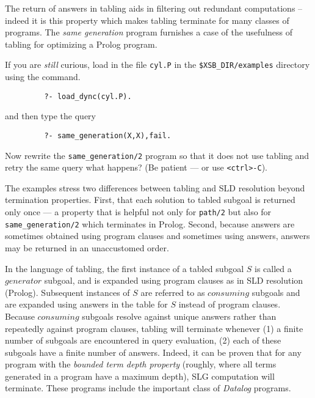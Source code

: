 The return of answers in tabling aids in filtering out redundant
computations -- indeed it is this property which makes tabling
terminate for many classes of programs.  The {\em same generation}
program furnishes a case of the usefulness of tabling for optimizing a
Prolog program.

\begin{exercise} \label{ex:samegen}
If you are {\em still} curious, load in the file {\tt cyl.P} in the
\verb|$XSB_DIR/examples| directory using the command.
\begin{verbatim}
         ?- load_dync(cyl.P).
\end{verbatim}
and then type the query
\begin{verbatim}
         ?- same_generation(X,X),fail.
\end{verbatim}
Now rewrite the {\tt same\_generation/2} program so that it does not
use tabling and retry the same query what happens?  (Be patient --- or
use \verb|<ctrl>-C|).
\end{exercise}

The examples stress two differences between tabling and SLD resolution
beyond termination properties.  First, that each solution to tabled
subgoal is returned only once --- a property that is helpful not only
for {\tt path/2} but also for {\tt same\_generation/2} which
terminates in Prolog.  Second, because answers are sometimes obtained
using program clauses and sometimes using answers, answers may be
returned in an unaccustomed order.

In the language of tabling, the first instance of a tabled subgoal $S$
is called a $generator$ subgoal, and is expanded using program clauses
as in SLD resolution (Prolog).  Subsequent instances of $S$ are
referred to as $consuming$ subgoals and are expanded using answers in
the table for $S$ instead of program clauses.  Because $consuming$
subgoals resolve against unique answers rather than repeatedly against
program clauses, tabling will terminate whenever (1) a finite number
of subgoals are encountered in query evaluation, (2) each of these
subgoals have a finite number of answers.  Indeed, it can be proven
that for any program with the {\em bounded term depth property}
(roughly, where all terms generated in a program have a maximum
depth), SLG computation will terminate.  These programs include the
important class of {\em Datalog} programs.

